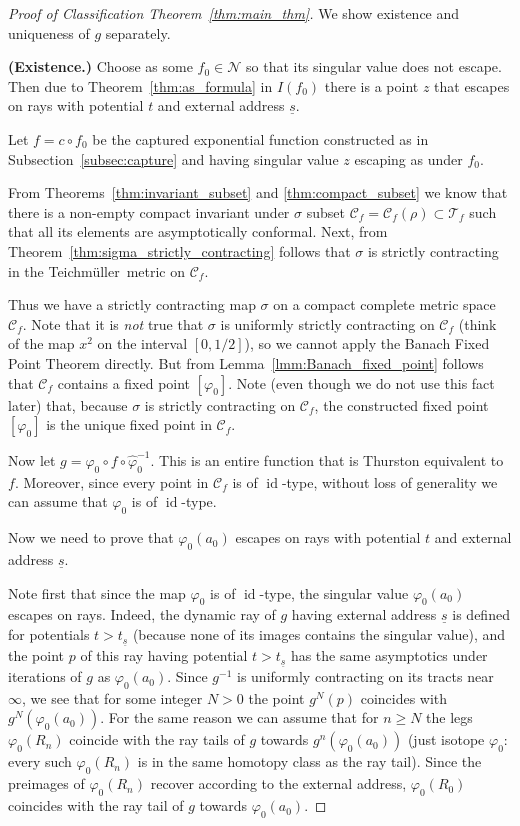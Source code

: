 \documentclass[10pt,reqno,a4paper]{amsart}
\numberwithin{figure}{section}
\numberwithin{equation}{section}
\newcommand{\tei}{Teichm\"uller}
\newcommand{\idt}{of $\id$-type}
\newcommand{\id}{\operatorname{id}}
\begin{document}
\begin{proof}[Proof of Classification Theorem~\ref{thm:main_thm}]
	
	We show existence and uniqueness of $g$ separately.
	
	\textbf{(Existence.)} Choose as some $f_0\in\mathcal{N}$ so that its singular value does not escape. Then due to Theorem~\ref{thm:as_formula} in $I(f_0)$ there is a point $z$ that escapes on rays with potential $t$ and external address $\underline{s}$.
	
	Let $f=c\circ f_0$ be the captured exponential function constructed as in Subsection~\ref{subsec:capture} and having singular value $z$ escaping as under $f_0$.
	
	From Theorems~\ref{thm:invariant_subset} and \ref{thm:compact_subset} we know that there is a non-empty compact invariant under $\sigma$ subset $\mathcal{C}_f=\mathcal{C}_f(\rho)\subset\mathcal{T}_f$ such that all its elements are asymptotically conformal. Next, from Theorem~\ref{thm:sigma_strictly_contracting} follows that $\sigma$ is strictly contracting in the \tei\ metric on $\mathcal{C}_f$.
	
	Thus we have a strictly contracting map $\sigma$ on a compact complete metric space $\mathcal{C}_f$. Note that it is \emph{not} true that $\sigma$ is uniformly strictly contracting on $\mathcal{C}_f$ (think of the map $x^2$ on the interval $[0,1/2]$), so we cannot apply the Banach Fixed Point Theorem directly. But from Lemma~\ref{lmm:Banach_fixed_point} follows that $\mathcal{C}_f$ contains a fixed point $[\varphi_0]$. Note (even though we do not use this fact later) that, because $\sigma$ is strictly contracting on $\mathcal{C}_f$, the constructed fixed point $[\varphi_0]$ is the unique fixed point in $\mathcal{C}_f$.
	
	Now let $g=\varphi_0\circ f\circ\hat{\varphi}_0^{-1}$. This is an entire function that is Thurston equivalent to $f$. Moreover, since every point in $\mathcal{C}_f$ is \idt, without loss of generality we can assume that $\varphi_0$ is \idt.
	
	Now we need to prove that $\varphi_0(a_0)$ escapes on rays with potential $t$ and external address $\underline{s}$.
	
	Note first that since the map $\varphi_0$ is \idt,  the singular value $\varphi_0(a_0)$ escapes on rays. Indeed, the dynamic ray of $g$ having external address $\underline{s}$ is defined for potentials $t>t_{\underline{s}}$ (because none of its images contains the singular value), and the point $p$ of this ray having potential $t>t_{\underline{s}}$ has the same asymptotics under iterations of $g$ as $\varphi_0(a_0)$. Since $g^{-1}$ is uniformly contracting on its tracts near $\infty$, we see that for some integer $N>0$ the point $g^N(p)$ coincides with $g^N(\varphi_0(a_0))$. For the same reason we can assume that for $n\geq N$ the legs $\varphi_0(R_n)$ coincide with the ray tails of $g$ towards $g^n(\varphi_0(a_0))$ (just isotope $\varphi_0$: every such $\varphi_0(R_n)$ is in the same homotopy class as the ray tail). Since the preimages of $\varphi_0(R_n)$ recover according to the external address, $\varphi_0(R_0)$ coincides with the ray tail of $g$ towards $\varphi_0(a_0)$.
	

\end{proof}
\end{document}
